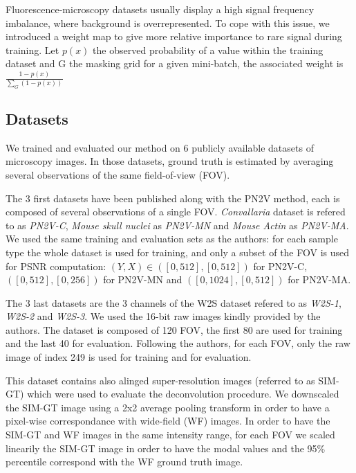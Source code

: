 \documentclass{article}
\begin{document}
Fluorescence-microscopy datasets usually display a high signal frequency imbalance, where background is overrepresented. To cope with this issue, we introduced a weight map to give more relative importance to rare signal during training. Let $p(x)$ the observed probability of a value within the training dataset and G the masking grid for a given mini-batch, the associated weight is $\frac{1 - p(x)}{\sum_{G}(1 - p(x))}$

\subsection{Datasets}
We trained and evaluated our method on 6 publicly available datasets of microscopy images. In those datasets, ground truth is estimated by averaging several observations of the same field-of-view (FOV).

The 3 first datasets have been published along with the PN2V method\cite{krull2019probabilistic}, each is composed of several observations of a single FOV. \emph{Convallaria} dataset is refered to as \emph{PN2V-C}, \emph{Mouse skull nuclei} as \emph{PN2V-MN} and \emph{Mouse Actin} as \emph{PN2V-MA}. We used the same training and evaluation sets as the authors: for each sample type the whole dataset is used for training, and only a subset of the FOV is used for PSNR computation: $(Y,X)\in([0, 512], [0, 512])$ for PN2V-C, $([0, 512], [0, 256])$ for PN2V-MN and $([0, 1024], [0, 512])$ for PN2V-MA.

The 3 last datasets are the 3 channels of the W2S dataset\cite{zhou2020w2s} refered to as \emph{W2S-1}, \emph{W2S-2} and \emph{W2S-3}. We used the 16-bit raw images kindly provided by the authors. The dataset is composed of 120 FOV, the first 80 are used for training and the last 40 for evaluation. Following the authors, for each FOV, only the raw image of index 249 is used for training and for evaluation.

This dataset contains also alinged super-resolution images (referred to as SIM-GT) which were used to evaluate the deconvolution procedure. We downscaled the SIM-GT image using a 2x2 average pooling transform in order to have a pixel-wise correspondance with wide-field (WF) images. In order to have the SIM-GT and WF images in the same intensity range, for each FOV we scaled linearily the SIM-GT image in order to have the modal values and the 95\% percentile correspond with the WF ground truth image.
\end{document}
